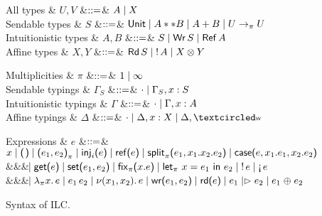 \begin{figure*}[t]

  \begin{minipage}{.5\textwidth}
  \begin{grammar}
    All types
    & $U, V$
    &$\mathrel{::=}$& $A \mathrel{\mid} X$
    \\
    Sendable types
    & $S$
    &$\mathrel{::=}$& $\text{\textsf{Unit}} \mathrel{\mid} A ** B \mathrel{\mid} {A} + {B} \mathrel{\mid} {U}\rightarrow_{\pi}{U}$
    \\
    Intuitionistic types
    & $A,B$
    &$\mathrel{::=}$& $S \mathrel{\mid} \text{\textsf{Wr}}\,S \mathrel{\mid} \text{\textsf{Ref}}\,A$
    \\
    Affine types
    & $X,Y$
    &$\mathrel{::=}$& $\text{\textsf{Rd}}\,S \mathrel{\mid} {!}\,{A} \mathrel{\mid}
    {X}\otimes{Y}$
  \end{grammar}    
  \end{minipage}%
  \begin{minipage}{.5\textwidth}
  \begin{grammar}
    Multiplicities
    & $\pi$
    &$\mathrel{::=}$& $1 \mathrel{\mid} \infty$    
    \\
    Sendable typings
    & ${\Gamma}_S$
    &$\mathrel{::=}$& $\cdot \mathrel{\mid} {\Gamma}_S,x:S$
    \\
    Intuitionistic typings
    & $\Gamma$
    &$\mathrel{::=}$& $\cdot \mathrel{\mid} \Gamma,x:A$
    \\
    Affine typings
    & $\Delta$
    &$\mathrel{::=}$& $\emptyctxt \bnfalt \Delta,x:X \bnfalt \Delta, \wrtok$
  \end{grammar}    
  \end{minipage}
  \begin{grammar}
    Expressions
    & $e$
    &$\mathrel{::=}$&
    $\eVar{x} \bnfalt \eUnit \bnfalt \ePair{e_1}{e_2} \bnfalt \eInj{i}{e}
    \bnfalt \eRef{e} \bnfalt \eSplit{e_1}{x_1}{x_2}{e_2} \bnfalt
    \eCase{e}{x_1}{e_1}{x_2}{e_2}$
    \\ &&& $\hspace{-1.02ex}\mathrel{\mid} \text{\textsf{get}}\textsf{(}{e}\textsf{)} \mathrel{\mid} \text{\textsf{set}}\textsf{(}{e_1},{e_2}\textsf{)} \mathrel{\mid} \text{\textsf{fix}}_{\pi}\textsf{(}{x}.{e}\textsf{)}
    \mathrel{\mid} \text{\textsf{let}}_{\pi}\ {x} = {e_1}\ \text{\textsf{in}}\ {e_2} \mathrel{\mid} {!}\,{e} \mathrel{\mid} \textnormal{!`}\,{e}$
    \\ &&& $\hspace{-1.02ex}\mathrel{\mid} \lambda_{\pi} {x}.\,{e} \mathrel{\mid} e_1\,e_2
    \mathrel{\mid} \nu(x_1,x_2).\,e \mathrel{\mid} \text{\textsf{wr}}\textsf{(}{e_1},{e_2}\textsf{)}
    \mathrel{\mid} \text{\textsf{rd}}\textsf{(}{e}\textsf{)} \mathrel{\mid} e_1 \mathrel{|\rhd} e_2 \mathrel{\mid} e_1 \mathrel{\oplus} e_2$
  \end{grammar}      
  \caption{Syntax of ILC.}
  \label{fig:ilc-syntax}
\end{figure*}
